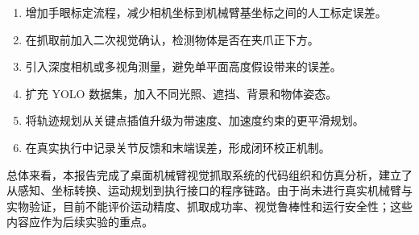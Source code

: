 \begin{enumerate}
  \item 增加手眼标定流程，减少相机坐标到机械臂基坐标之间的人工标定误差。
  \item 在抓取前加入二次视觉确认，检测物体是否在夹爪正下方。
  \item 引入深度相机或多视角测量，避免单平面高度假设带来的误差。
  \item 扩充 YOLO 数据集，加入不同光照、遮挡、背景和物体姿态。
  \item 将轨迹规划从关键点插值升级为带速度、加速度约束的更平滑规划。
  \item 在真实执行中记录关节反馈和末端误差，形成闭环校正机制。
\end{enumerate}

总体来看，本报告完成了桌面机械臂视觉抓取系统的代码组织和仿真分析，建立了从感知、坐标转换、运动规划到执行接口的程序链路。由于尚未进行真实机械臂与实物验证，目前不能评价运动精度、抓取成功率、视觉鲁棒性和运行安全性；这些内容应作为后续实验的重点。
